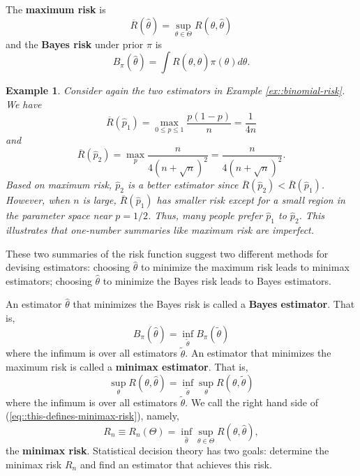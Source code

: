 \documentclass[twoside,12pt]{article}
\newtheorem{example}[theorem]{Example}
\begin{document}
The {\bf maximum risk} is
\begin{equation}
\overline{R}(\widehat\theta)=\sup_{\theta\in\Theta} R(\theta, \widehat\theta)
\end{equation}
and the {\bf Bayes risk} under prior $\pi$ is
\begin{equation}
B_\pi(\widehat\theta) = \int R(\theta,\widehat\theta) \pi(\theta)d\theta.
\end{equation}


\begin{example}
Consider again
the two estimators in Example \ref{ex::binomial-risk}.
We have
$$
\overline{R}(\widehat{p}_1) = \max_{0 \leq p \leq 1}\frac{p (1-p)}{n} = \frac{1}{4n}
$$
and
$$
\overline{R}(\widehat{p}_2) = \max_p \frac{n}{ 4(n+ \sqrt{n})^2} =
\frac{n}{ 4(n+ \sqrt{n})^2}.
$$
Based on maximum risk,
$\widehat{p}_2$ is a better estimator since
$\overline{R}(\widehat{p}_2)< \overline{R}(\widehat{p}_1)$.
However, when $n$ is large,
$\overline{R}(\widehat{p}_1)$ has smaller risk
except for a small region in the parameter space near $p=1/2$.
Thus, many people prefer
$\widehat{p}_1$ to
$\widehat{p}_2$.
This illustrates that one-number summaries like
maximum risk are imperfect.
\end{example}

These two summaries of the risk function
suggest two different methods
for devising estimators:
choosing $\widehat\theta$ to minimize the maximum risk
leads to minimax estimators;
choosing $\widehat\theta$ to minimize the Bayes risk
leads to Bayes estimators.


An estimator $\widehat\theta$ that minimizes the Bayes risk is called a
{\bf Bayes estimator}.
That is,
\begin{equation}
B_\pi(\widehat\theta) = \inf_{\tilde{\theta}}B_\pi(\tilde{\theta})
\end{equation}
where the infimum is over all estimators $\tilde{\theta}$.
An estimator that minimizes the maximum risk is called
a {\bf minimax estimator}.
That is,
\begin{equation}\label{eq::this-defines-minimax-risk}
\sup_\theta R(\theta,\widehat\theta) = 
\inf_{\tilde{\theta}}\sup_\theta R(\theta,\tilde{\theta})
\end{equation}
where the infimum is over all estimators $\tilde{\theta}$.
We call the right hand side of
(\ref{eq::this-defines-minimax-risk}), namely,
\begin{equation}
R_n \equiv R_n(\Theta)=\inf_{\widehat{\theta}}\sup_{\theta\in\Theta} R(\theta,\widehat{\theta}),
\end{equation}
the {\bf minimax risk}.
Statistical decision theory has
two goals: determine the minimax risk $R_n$
and find an estimator that achieves this risk.
\end{document}
